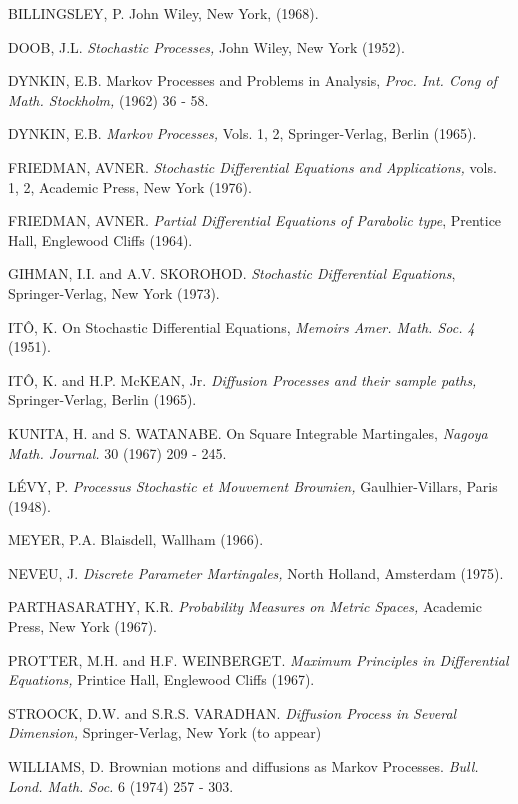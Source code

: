 \begin{thebibliography}{0}
 BILLINGSLEY, P. John Wiley, New York, (1968).

 DOOB, J.L. {\em Stochastic Processes,} John Wiley, New
  York (1952).

 DYNKIN, E.B. Markov Processes and Problems in Analysis,
  {\em Proc. Int. Cong of Math. Stockholm,} (1962) 36 - 58.

 DYNKIN, E.B. {\em Markov Processes,} Vols. 1, 2,
  Springer-Verlag, Berlin (1965).

 FRIEDMAN, AVNER. {\em Stochastic Differential Equations
  and Applications,} vols. 1, 2, Academic Press, New York (1976).

 FRIEDMAN, AVNER. {\em Partial Differential Equations of
  Parabolic type}, Prentice Hall, Englewood Cliffs (1964).

 GIHMAN, I.I. and A.V. SKOROHOD. {\em Stochastic
  Differential Equations}, Springer-Verlag, New York (1973).

 IT\^O, K. On Stochastic Differential Equations, {\em
  Memoirs Amer. Math. Soc. 4} (1951).

 IT\^O, K. and H.P. McKEAN, Jr. {\em Diffusion Processes
  and their sample paths,} Springer-Verlag, Berlin (1965).

 KUNITA, H. and S. WATANABE. On Square Integrable
  Martingales, {\em Nagoya Math. Journal.} 30 (1967) 209 - 245.

 L\'EVY, P. {\em Processus Stochastic et Mouvement
  Brownien,} Gaulhier-Villars, Paris (1948).

 MEYER, P.A. Blaisdell, Wallham (1966).

 NEVEU, J. {\em Discrete Parameter Martingales,} North
  Holland, Amsterdam (1975).

 PARTHASARATHY, K.R. {\em Probability Measures on
  Metric Spaces,} Academic Press, New York (1967).

 PROTTER, M.H. and H.F. WEINBERGET. {\em Maximum
  Principles in Differential Equations,} Printice Hall, Englewood
  Cliffs (1967).

 STROOCK, D.W. and S.R.S. VARADHAN. {\em Diffusion
  Process in Several Dimension,} Springer-Verlag, New York (to appear)

 WILLIAMS, D. Brownian motions and diffusions as Markov
  Processes. {\em Bull. Lond. Math. Soc.} 6 (1974) 257 - 303.

\end{thebibliography}
